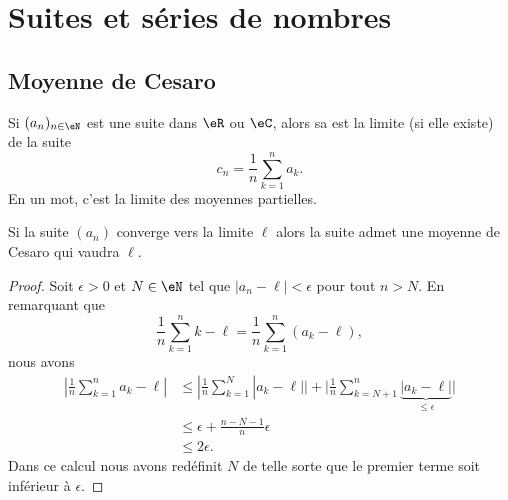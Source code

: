 
\section{Suites et séries de nombres}

\subsection{Moyenne de Cesaro}

Si \( (a_n)_{n\in \eN} \) est une suite dans \( \eR\) ou \( \eC\), alors sa  est la limite (si elle existe) de la suite
\begin{equation}
    c_n=\frac{1}{ n }\sum_{k=1}^na_k.
\end{equation}
En un mot, c'est la limite des moyennes partielles.

\begin{lemma}       \label{LemyGjMqM}
    Si la suite \( (a_n)\) converge vers la limite \( \ell\) alors la suite admet une moyenne de Cesaro qui vaudra \( \ell\).
\end{lemma}

\begin{proof}
    Soit \( \epsilon>0\) et \( N\in \eN\) tel que \( | a_n-\ell |<\epsilon\) pour tout \( n>N\). En remarquant que
    \begin{equation}
        \frac{1}{ n }\sum_{k=1}^nk-\ell=\frac{1}{ n }\sum_{k=1}^n(a_k-\ell),
    \end{equation}
    nous avons
    \begin{subequations}
        \begin{align}
            | \frac{1}{ n }\sum_{k=1}^na_k-\ell |&\leq| \frac{1}{ n }\sum_{k=1}^N| a_k-\ell | |+\big| \frac{1}{ n }\sum_{k=N+1}^n\underbrace{| a_k-\ell |}_{\leq \epsilon} \big|\\
            &\leq \epsilon+\frac{ n-N-1 }{ n }\epsilon\\
            &\leq 2\epsilon.
        \end{align}
    \end{subequations}
    Dans ce calcul nous avons redéfinit \( N\) de telle sorte que le premier terme soit inférieur à \( \epsilon\).
\end{proof}


